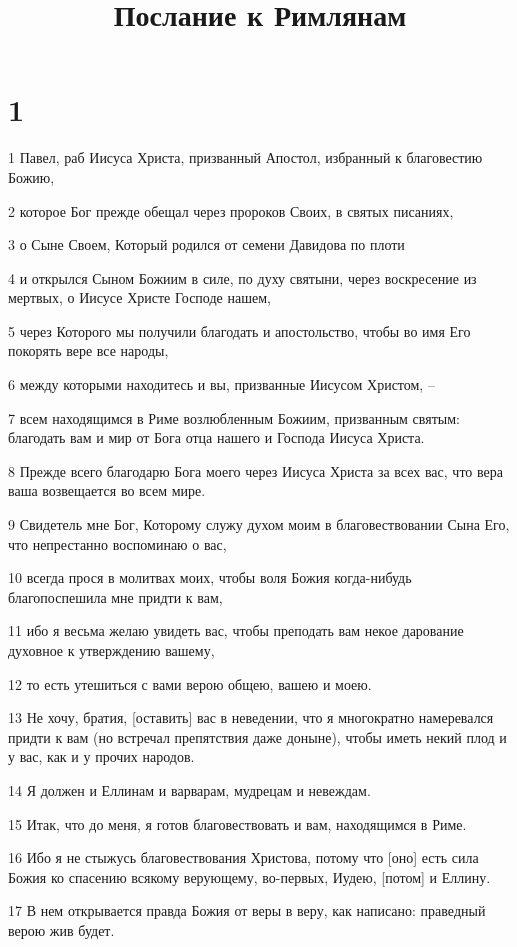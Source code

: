 

\title{Послание к Римлянам}


\chapter{1}

\par 1 Павел, раб Иисуса Христа, призванный Апостол, избранный к благовестию Божию,
\par 2 которое Бог прежде обещал через пророков Своих, в святых писаниях,
\par 3 о Сыне Своем, Который родился от семени Давидова по плоти
\par 4 и открылся Сыном Божиим в силе, по духу святыни, через воскресение из мертвых, о Иисусе Христе Господе нашем,
\par 5 через Которого мы получили благодать и апостольство, чтобы во имя Его покорять вере все народы,
\par 6 между которыми находитесь и вы, призванные Иисусом Христом, --
\par 7 всем находящимся в Риме возлюбленным Божиим, призванным святым: благодать вам и мир от Бога отца нашего и Господа Иисуса Христа.
\par 8 Прежде всего благодарю Бога моего через Иисуса Христа за всех вас, что вера ваша возвещается во всем мире.
\par 9 Свидетель мне Бог, Которому служу духом моим в благовествовании Сына Его, что непрестанно воспоминаю о вас,
\par 10 всегда прося в молитвах моих, чтобы воля Божия когда-нибудь благопоспешила мне придти к вам,
\par 11 ибо я весьма желаю увидеть вас, чтобы преподать вам некое дарование духовное к утверждению вашему,
\par 12 то есть утешиться с вами верою общею, вашею и моею.
\par 13 Не хочу, братия, [оставить] вас в неведении, что я многократно намеревался придти к вам (но встречал препятствия даже доныне), чтобы иметь некий плод и у вас, как и у прочих народов.
\par 14 Я должен и Еллинам и варварам, мудрецам и невеждам.
\par 15 Итак, что до меня, я готов благовествовать и вам, находящимся в Риме.
\par 16 Ибо я не стыжусь благовествования Христова, потому что [оно] есть сила Божия ко спасению всякому верующему, во-первых, Иудею, [потом] и Еллину.
\par 17 В нем открывается правда Божия от веры в веру, как написано: праведный верою жив будет.
